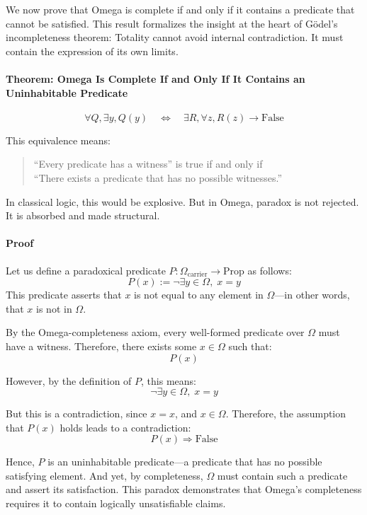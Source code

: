\documentclass[12pt]{article}
\begin{document}
We now prove that Omega is complete if and only if it contains a predicate that cannot be satisfied. This result formalizes the insight at the heart of Gödel’s incompleteness theorem: Totality cannot avoid internal contradiction. It must contain the expression of its own limits.

\paragraph{Theorem: Omega Is Complete If and Only If It Contains an Uninhabitable Predicate}

\[
\forall Q, \exists y, Q(y)
\quad \iff \quad
\exists R, \forall z, R(z) \rightarrow \text{False}
\]

This equivalence means:
\begin{quote}
``Every predicate has a witness'' is true if and only if \\
``There exists a predicate that has no possible witnesses.''
\end{quote}

In classical logic, this would be explosive. But in Omega, paradox is not rejected.  
It is absorbed and made structural.

\paragraph{Proof}

Let us define a paradoxical predicate \( P : \Omega_{\text{carrier}} \to \text{Prop} \) as follows:
\[
P(x) := \neg \exists y \in \Omega, \; x = y
\]
This predicate asserts that \( x \) is not equal to any element in \( \Omega \)—in other words, that \( x \) is not in \( \Omega \).

By the Omega-completeness axiom, every well-formed predicate over \( \Omega \) must have a witness. Therefore, there exists some \( x \in \Omega \) such that:
\[
P(x)
\]

However, by the definition of \( P \), this means:
\[
\neg \exists y \in \Omega, \; x = y
\]

But this is a contradiction, since \( x = x \), and \( x \in \Omega \). Therefore, the assumption that \( P(x) \) holds leads to a contradiction:
\[
P(x) \Rightarrow \text{False}
\]

Hence, \( P \) is an uninhabitable predicate—a predicate that has no possible satisfying element. And yet, by completeness, \( \Omega \) must contain such a predicate and assert its satisfaction. This paradox demonstrates that Omega’s completeness requires it to contain logically unsatisfiable claims.
\end{document}
